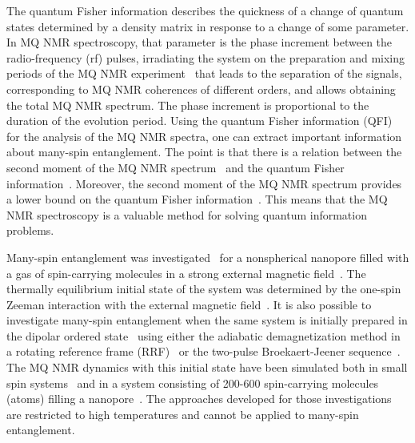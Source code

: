 \documentclass[review]{elsarticle}
\begin{document}
The quantum Fisher information describes the quickness of a change of quantum states determined by a density matrix in response to a change of some parameter. 
In MQ NMR spectroscopy, that parameter is the phase increment between the radio-frequency (rf) pulses, irradiating the system on the preparation and mixing periods of the MQ NMR experiment~\cite{Baum_1985} 
that leads to the separation of the signals, corresponding to MQ NMR coherences of different orders, and allows obtaining the total MQ NMR spectrum. 
The phase increment is proportional to the duration of the evolution period.
Using the quantum Fisher information (QFI)~\cite{Liu_2014} for the analysis of the MQ NMR spectra, one can extract important information about many-spin entanglement.
The point is that there is a relation between the second moment of the MQ NMR spectrum~\cite{Khitrin_1997} and the quantum Fisher information~\cite{G_rttner_2018,Doronin_2019}.
Moreover, the second moment of the MQ NMR spectrum provides a lower bound on the quantum Fisher information~\cite{G_rttner_2018}.
This means that the MQ NMR spectroscopy is a valuable method for solving quantum information problems.

Many-spin entanglement was investigated~\cite{Doronin_2019} for a nonspherical nanopore filled with a gas of spin-carrying molecules in a strong external magnetic field~\cite{Baugh_2001,Doronin_2009}.
The thermally equilibrium initial state of the system was determined by the one-spin Zeeman interaction with the external magnetic field~\cite{Doronin_2007a}.
It is also possible to investigate many-spin entanglement when the same system is initially prepared in the dipolar ordered state~\cite{Goldman_1970} using either the adiabatic demagnetization method in a rotating reference frame (RRF)~\cite{Goldman_1970,Slichter_1961} or the two-pulse Broekaert-Jeener sequence~\cite{Goldman_1970,Jeener_1967}.
The MQ NMR dynamics with this initial state have been simulated both in small spin systems~\cite{Doronin_2007a,Doronin_2007b} and in a system consisting of 200-600 spin-carrying molecules (atoms) filling a nanopore~\cite{Doronin_2011}.
The approaches developed for those investigations are restricted to  high temperatures and cannot be applied to  many-spin entanglement.
\end{document}
